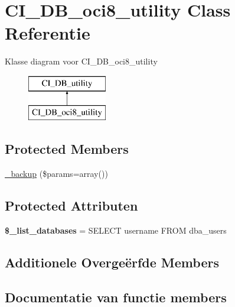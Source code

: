 \hypertarget{class_c_i___d_b__oci8__utility}{}\section{C\+I\+\_\+\+D\+B\+\_\+oci8\+\_\+utility Class Referentie}
\label{class_c_i___d_b__oci8__utility}
Klasse diagram voor C\+I\+\_\+\+D\+B\+\_\+oci8\+\_\+utility\begin{figure}[H]
\begin{center}
\leavevmode
\includegraphics[height=2.000000cm]{class_c_i___d_b__oci8__utility}
\end{center}
\end{figure}
\subsection*{Protected Members}
\begin{DoxyCompactItemize}
\item 
\mbox{\hyperlink{class_c_i___d_b__oci8__utility_a30f3053d2c82e7562349924363507afa}{\+\_\+backup}} (\$params=array())
\end{DoxyCompactItemize}
\subsection*{Protected Attributen}
\begin{DoxyCompactItemize}
\item 
\mbox{\label{class_c_i___d_b__oci8__utility_afe3a5b80562d93d6bc7e2b53c95b7e5a}} 
{\bfseries \$\+\_\+list\+\_\+databases} = \textquotesingle{}S\+E\+L\+E\+CT username F\+R\+OM dba\+\_\+users\textquotesingle{}
\end{DoxyCompactItemize}
\subsection*{Additionele Overge\"{e}rfde Members}


\subsection{Documentatie van functie members}
\mbox{\label{class_c_i___d_b__oci8__utility_a30f3053d2c82e7562349924363507afa}} 
